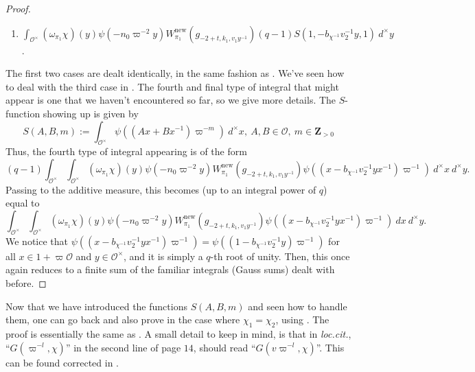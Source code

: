 \documentclass{amsart}
\theoremstyle{plain}
\theoremstyle{plain}
\theoremstyle{remark}
\begin{document}
\begin{proof}
\begin{enumerate}
            \item $\displaystyle\int_{\mathcal{O}^\times}(\omega_{\pi_1}\chi)(y)\psi\left(-n_0\varpi^{-2}y\right)W_{\pi_1}^\mathrm{new}(g_{-2+t,k_1,v_1y^{-1}}) (q-1)S(1,-b_{\chi^{-1}} v_2^{-1}y,1)\ d^\times y$.
        \end{enumerate}
        The first two cases are dealt identically, in the same fashion as . We've seen how to deal with the third case in  . The fourth and final type of integral that might appear is one that we haven't encountered so far, so we give more details. The $S$-function showing up is given by
        $$S(A,B,m):=\int_{\mathcal{O}^\times}\psi((Ax+Bx^{-1})\varpi^{-m})\ d^\times x,\ A,B\in\mathcal{O},\ m\in\mathbf{Z}_{>0}$$
        Thus, the fourth type of integral appearing is of the form
        $$(q-1)\int_{\mathcal{O}^\times}\int_{\mathcal{O}^\times}(\omega_{\pi_1}\chi)(y)\psi\left(-n_0\varpi^{-2}y\right)W_{\pi_1}^\mathrm{new}(g_{-2+t,k_1,v_1y^{-1}})\psi\left((x-b_{\chi^{-1}} v_2^{-1}yx^{-1})\varpi^{-1}\right)\ d^\times x\ d^\times y.$$
       Passing to the additive measure, this becomes (up to an integral power of $q$) equal to $$\int_{\mathcal{O}^\times}\int_{\mathcal{O}^\times}(\omega_{\pi_1}\chi)(y)\psi\left(-n_0\varpi^{-2}y\right)W_{\pi_1}^\mathrm{new}(g_{-2+t,k_1,v_1y^{-1}})\psi\left((x-b_{\chi^{-1}} v_2^{-1}yx^{-1})\varpi^{-1}\right)\ d x\ d^\times y.$$
       We notice that $\psi\left((x-b_{\chi^{-1}} v_2^{-1}yx^{-1})\varpi^{-1}\right)=\psi\left((1-b_{\chi^{-1}} v_2^{-1}y)\varpi^{-1}\right)$ for all $x\in 1+\varpi\mathcal{O}$ and $y\in\mathcal{O}^\times$, and it is simply a $q$-th root of unity. Then, this once again reduces to a finite sum of the familiar integrals (Gauss sums) dealt with before. 
\end{proof}
Now that we have introduced the functions $S(A,B,m)$ and seen how to handle them, one can go back and also prove  in the case where $\chi_1=\chi_2$, using \cite[Lemma $3.5$]{Assing_2018}. The proof is essentially the same as . A small detail to keep in mind, is that in \textit{loc.cit.}, ``$G(\varpi^{-l},\chi)$'' in the second line of page $14$, should read ``$G(v\varpi^{-l},\chi)$''. This can be found corrected in \cite[Lemma $3.3.8$]{Assing_2019}.
\end{document}
